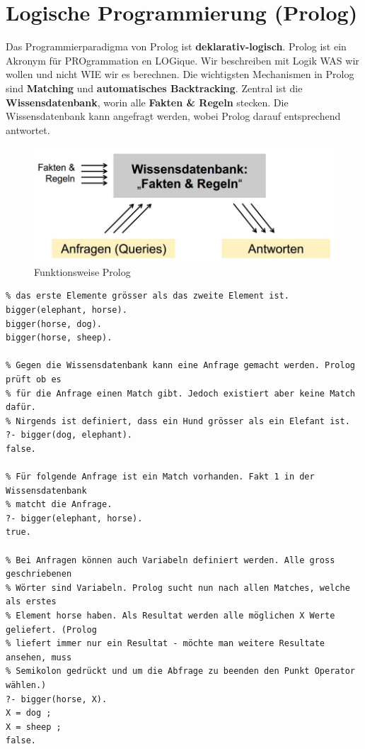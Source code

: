 \chapter{Logische Programmierung (Prolog)}
Das Programmierparadigma von Prolog ist \textbf{deklarativ-logisch}. Prolog ist ein Akronym für PROgrammation en LOGique. Wir beschreiben mit Logik WAS wir wollen und nicht WIE wir es berechnen. Die wichtigsten Mechanismen in Prolog sind \textbf{Matching} und \textbf{automatisches Backtracking}. Zentral ist die \textbf{Wissensdatenbank}, worin alle \textbf{Fakten \& Regeln} stecken. Die Wissensdatenbank kann angefragt werden, wobei Prolog darauf entsprechend antwortet.

\begin{figure}[h!]
\centering
\includegraphics[width=0.7\linewidth]{fig/prolog-funktionsweise}
\caption{Funktionsweise Prolog}
\label{fig:funktionsweise-prolog}
\end{figure}

\begin{lstlisting}[caption=Wissensdatebank mit nur Fakten]
% In folgender Wissensdatenbank sind drei Fakten enthalten. Bigger definiert, dass
% das erste Elemente grösser als das zweite Element ist.
bigger(elephant, horse).
bigger(horse, dog).
bigger(horse, sheep).

% Gegen die Wissensdatenbank kann eine Anfrage gemacht werden. Prolog prüft ob es 
% für die Anfrage einen Match gibt. Jedoch existiert aber keine Match dafür. 
% Nirgends ist definiert, dass ein Hund grösser als ein Elefant ist.
?- bigger(dog, elephant).
false.

% Für folgende Anfrage ist ein Match vorhanden. Fakt 1 in der Wissensdatenbank 
% matcht die Anfrage.
?- bigger(elephant, horse).
true.

% Bei Anfragen können auch Variabeln definiert werden. Alle gross geschriebenen 
% Wörter sind Variabeln. Prolog sucht nun nach allen Matches, welche als erstes 
% Element horse haben. Als Resultat werden alle möglichen X Werte geliefert. (Prolog 
% liefert immer nur ein Resultat - möchte man weitere Resultate ansehen, muss 
% Semikolon gedrückt und um die Abfrage zu beenden den Punkt Operator wählen.)
?- bigger(horse, X).
X = dog ;
X = sheep ;
false.
\end{lstlisting}

